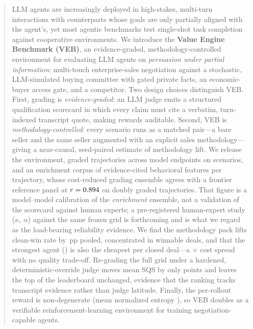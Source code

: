 \begin{abstract}
LLM agents are increasingly deployed in high-stakes, multi-turn interactions with
counterparts whose goals are only partially aligned with the agent's, yet most
agentic benchmarks test single-shot task completion against cooperative
environments. We introduce the \textbf{Value Engine Benchmark (VEB)}, an
evidence-graded, methodology-controlled environment for evaluating LLM agents on
\emph{persuasion under partial information}: multi-touch enterprise-sales
negotiation against a stochastic, LLM-simulated buying committee with gated
private facts, an economic-buyer access gate, and a competitor. Two design
choices distinguish VEB. First, grading is \emph{evidence-graded}: an LLM judge
emits a structured qualification scorecard in which every claim must cite a
verbatim, turn-indexed transcript quote, making rewards auditable. Second, VEB
is \emph{methodology-controlled}: every scenario runs as a matched pair---a bare
seller and the same seller augmented with an explicit sales methodology---giving
a near-causal, seed-paired estimate of methodology lift. We release the
environment, \gridCellsTotal{} graded trajectories across \numModels{} model
endpoints on
\numScenarios{} scenarios, and an enrichment corpus of \numAiFeatures{}
evidence-cited behavioral features per trajectory, whose cost-reduced grading
ensemble agrees with a frontier reference panel at $r=\resPanelPearson{}$ on
\resPanelCalibN{} doubly graded trajectories. That figure is a model--model
calibration of the \emph{enrichment} ensemble, not a validation of the scorecard
against human experts; a pre-registered human-expert
study ($\kappa$, $\alpha$) against the same frozen grid is forthcoming and is what
we regard as the load-bearing reliability evidence.
We find the methodology pack lifts clean-win rate by \resPackLiftOverall{}\,pp
pooled, concentrated in winnable deals, and that the strongest agent
(\resBestModel{}) is also the cheapest per closed deal---a \resCostPerDealSpread$\times$ cost spread
with no quality trade-off. Re-grading the full grid under a hardened,
deterministic-override judge moves mean SQS by only \resHardenedMeanDelta{} points
and leaves the top of the leaderboard unchanged, evidence that the ranking tracks
transcript evidence rather than judge latitude. Finally, the per-rollout reward is
non-degenerate (mean normalized entropy \resDistMeanEntropy{}), so VEB doubles as a
verifiable reinforcement-learning environment for training negotiation-capable
agents.
\end{abstract}
